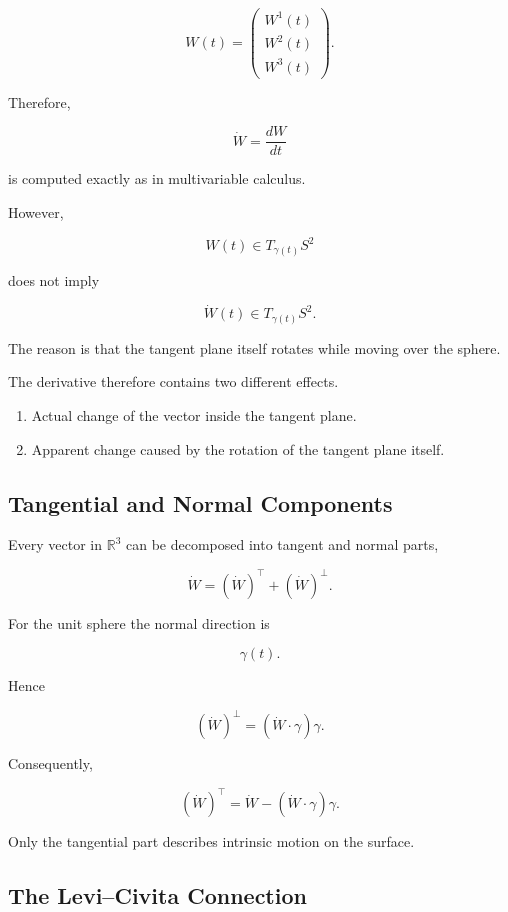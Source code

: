 \documentclass[12pt,a4paper]{article}
\theoremstyle{notespace}
\begin{document}
\[
W(t)=
\begin{pmatrix}
	W^1(t)\\
	W^2(t)\\
	W^3(t)
\end{pmatrix}.
\]

Therefore,

\[
\dot W
=
\frac{dW}{dt}
\]

is computed exactly as in multivariable calculus.

However,

\[
W(t)\in T_{\gamma(t)}S^2
\]

does not imply

\[
\dot W(t)\in T_{\gamma(t)}S^2.
\]

The reason is that the tangent plane itself rotates while moving over the sphere.

The derivative therefore contains two different effects.

\begin{enumerate}
	\item
	Actual change of the vector inside the tangent plane.
	
	\item
	Apparent change caused by the rotation of the tangent plane itself.
\end{enumerate}

\subsection{Tangential and Normal Components}

Every vector in $\mathbb R^3$ can be decomposed into tangent and normal parts,

\[
\dot W
=
(\dot W)^\top
+
(\dot W)^\perp.
\]

For the unit sphere the normal direction is

\[
\gamma(t).
\]

Hence

\[
(\dot W)^\perp
=
(\dot W\cdot\gamma)\gamma.
\]

Consequently,

\[
(\dot W)^\top
=
\dot W
-
(\dot W\cdot\gamma)\gamma.
\]

Only the tangential part describes intrinsic motion on the surface.

\subsection{The Levi--Civita Connection}
\end{document}
